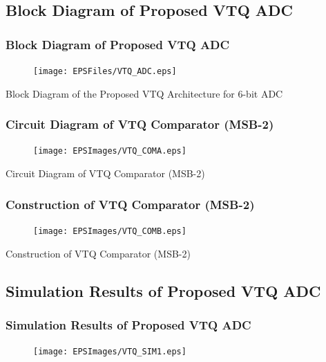 \subsection*{Block Diagram of Proposed VTQ ADC}
\begin{frame}
	\frametitle{Block Diagram of Proposed VTQ ADC}
	\begin{center}
		\begin{figure}
		\texttt{[image: EPSFiles/VTQ\_ADC.eps]}\\
		\end{figure}
	\small{Block Diagram of the Proposed VTQ Architecture for 6-bit ADC}
	\end{center}
\end{frame}
\begin{frame}
	\frametitle{Circuit Diagram of VTQ Comparator (MSB-2)}
	\begin{center}
		\begin{figure}
		\texttt{[image: EPSImages/VTQ\_COMA.eps]}\\
		\end{figure}
	\small{Circuit Diagram of VTQ Comparator (MSB-2)}
	\end{center}
\end{frame}
\begin{frame}
	\frametitle{Construction of VTQ Comparator (MSB-2)}
	\begin{center}
		\begin{figure}
		\texttt{[image: EPSImages/VTQ\_COMB.eps]}\\
		\end{figure}
	\small{Construction of VTQ Comparator (MSB-2)}
	\end{center}
\end{frame}
\subsection*{Simulation Results of Proposed VTQ ADC}
\begin{frame}
	\frametitle{Simulation Results of Proposed VTQ ADC}
	\begin{center}
		\begin{figure}
		\texttt{[image: EPSImages/VTQ\_SIM1.eps]}\\
		\end{figure}
	\end{center}
\end{frame}
